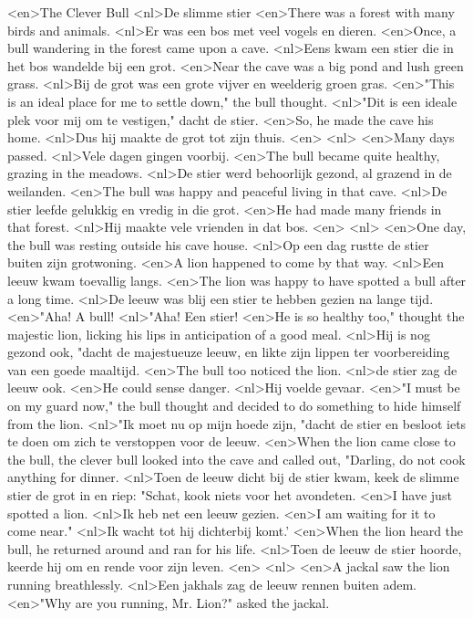 <en>The Clever Bull
<nl>De slimme stier
<en>There was a forest with many birds and animals.
<nl>Er was een bos met veel vogels en dieren.
<en>Once, a bull wandering in the forest came upon a cave.
<nl>Eens kwam een stier die in het bos wandelde bij een grot.
<en>Near the cave was a big pond and lush green grass.
<nl>Bij de grot was een grote vijver en weelderig groen gras.
<en>"This is an ideal place for me to settle down," the bull thought.
<nl>"Dit is een ideale plek voor mij om te vestigen," dacht de stier.
<en>So, he made the cave his home.
<nl>Dus hij maakte de grot tot zijn thuis.
<en>
<nl>
<en>Many days passed.
<nl>Vele dagen gingen voorbij.
<en>The bull became quite healthy, grazing in the meadows.
<nl>De stier werd behoorlijk gezond, al grazend in de weilanden.
<en>The bull was happy and peaceful living in that cave.
<nl>De stier leefde gelukkig en vredig in die grot.
<en>He had made many friends in that forest.
<nl>Hij maakte vele vrienden in dat bos.
<en>
<nl>
<en>One day, the bull was resting outside his cave house.
<nl>Op een dag rustte de stier buiten zijn grotwoning.
<en>A lion happened to come by that way.
<nl>Een leeuw kwam toevallig langs.
<en>The lion was happy to have spotted a bull after a long time.
<nl>De leeuw was blij een stier te hebben gezien na lange tijd.
<en>"Aha! A bull!
<nl>"Aha! Een stier!
<en>He is so healthy too," thought the majestic lion, licking his lips in anticipation of a good meal.
<nl>Hij is nog  gezond ook, "dacht de majestueuze leeuw, en likte zijn lippen ter voorbereiding van een goede maaltijd.
<en>The bull too noticed the lion.
<nl>de stier zag de leeuw ook.
<en>He could sense danger.
<nl>Hij voelde gevaar.
<en>"I must be on my guard now," the bull thought and decided to do something to hide himself from the lion.
<nl>"Ik moet nu op mijn hoede zijn, "dacht de stier en besloot iets te doen om zich te verstoppen voor de leeuw.
<en>When the lion came close to the bull, the clever bull looked into the cave and called out, "Darling, do not cook anything for dinner.
<nl>Toen de leeuw dicht bij de stier kwam, keek de slimme stier de grot in en riep: "Schat, kook niets voor het avondeten.
<en>I have just spotted a lion.
<nl>Ik heb net een leeuw gezien.
<en>I am waiting for it to come near."
<nl>Ik wacht tot hij dichterbij komt.'
<en>When the lion heard the bull, he returned around and ran for his life.
<nl>Toen de leeuw de stier hoorde, keerde hij om en rende voor zijn leven.
<en>
<nl>
<en>A jackal saw the lion running breathlessly.
<nl>Een jakhals zag de leeuw rennen buiten adem.
<en>"Why are you running, Mr. Lion?" asked the jackal.
